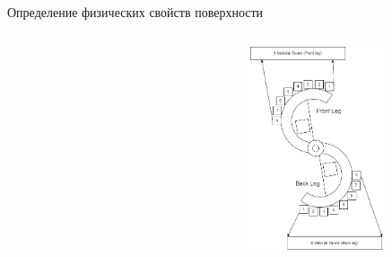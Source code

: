 \documentclass[aspectratio=169,xcolor=table]{beamer}
\begin{document}
\begin{frame}[t]{Определение физических свойств поверхности}
\begin{columns}[T,onlytextwidth]
\begin{column}{0.49\textwidth}
\begin{figure}[H]
                \label{fig:s_shape_leg/s_leg_setup.JPG}
            \end{figure}
        \end{column}
        \begin{column}{0.49\textwidth}
            \begin{figure}[H]
                \centering\includegraphics[height=6cm,width=1\textwidth,keepaspectratio]{s_shape_leg/leg_design.png}
                \label{fig:s_shape_leg/leg_design.png}
            \end{figure}
        \end{column}
    \end{columns}
\end{frame}
\end{document}
